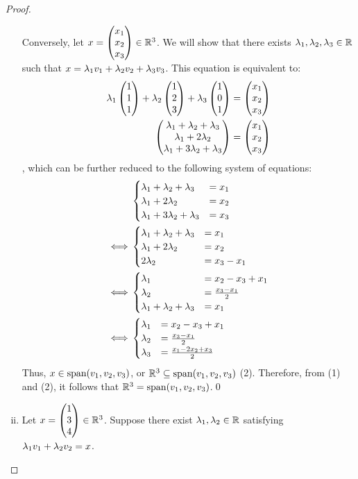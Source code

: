 \begin{proof}
\begin{enumerate}[(i)]
        Conversely, let $x=\begin{pmatrix} x_1\\ x_2\\ x_3\end{pmatrix}\in\mathbb R^3$. We will show that there exists $\lambda_1,\lambda_2,\lambda_3\in\mathbb R$ such that $x=\lambda_1v_1+\lambda_2v_2+\lambda_3v_3$.
        This equation is equivalent to: 
        \[
            \begin{aligned}
                \lambda_1 \begin{pmatrix} 1\\ 1\\ 1\end{pmatrix}+\lambda_2 \begin{pmatrix} 1\\ 2\\ 3\end{pmatrix}+\lambda_3 \begin{pmatrix} 1\\ 0\\ 1\end{pmatrix} &= \begin{pmatrix} x_1\\ x_2\\ x_3\end{pmatrix}\\
                \begin{pmatrix} \lambda_1+\lambda_2+\lambda_3\\ \lambda_1+2\lambda_2\\ \lambda_1+3\lambda_2+\lambda_3\end{pmatrix}              &= \begin{pmatrix} x_1\\ x_2\\ x_3\end{pmatrix}
            \end{aligned}
        \]
        , which can be further reduced to the following system of equations: 
        \begin{align*}
            &\begin{cases}
                \lambda_1+\lambda_2+\lambda_3  &= x_1\\
                \lambda_1+2\lambda_2        &= x_2\\
                \lambda_1+3\lambda_2+\lambda_3 &= x_3
            \end{cases}\\\iff
            &\begin{cases}
                \lambda_1+\lambda_2+\lambda_3  &= x_1\\
                \lambda_1+2\lambda_2        &= x_2\\
                2\lambda_2               &= x_3-x_1
            \end{cases}\\\iff
            &\begin{cases}
                \lambda_1                &= x_2-x_3+x_1\\
                \lambda_2                &= \frac{x_3-x_1}{2}\\
                \lambda_1+\lambda_2+\lambda_3  &= x_1
            \end{cases}\\\iff
            &\begin{cases}
                \lambda_1                &= x_2-x_3+x_1\\
                \lambda_2                &= \frac{x_3-x_1}{2}\\
                \lambda_3                &= \frac{x_1-2x_2+x_3}{2}
            \end{cases}
        \end{align*}
        Thus, $x\in\textnormal{span}(v_1,v_2,v_3)$, or $\mathbb R^3\subseteq\textnormal{span}(v_1,v_2,v_3)$ (2). Therefore, from (1) and (2), it follows that $\mathbb R^3=\textnormal{span}(v_1,v_2,v_3)$.\qed
        \item Let $x=\begin{pmatrix} 1\\ 3\\ 4\end{pmatrix}\in\mathbb R^3$. Suppose there exist $\lambda_1,\lambda_2\in\mathbb R$ satisfying $\lambda_1v_1+\lambda_2v_2=x$.  
    \end{enumerate}
\end{proof}